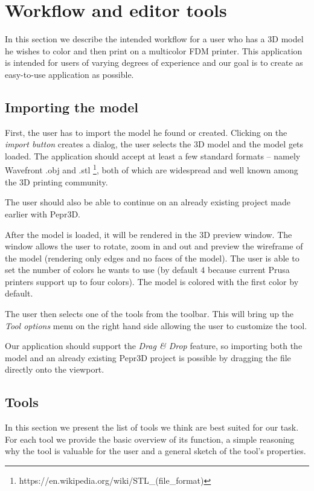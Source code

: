\section{Workflow and editor tools}

In this section we describe the intended workflow for a user who has a 3D model he wishes to color and then print on a multicolor FDM printer. This application is intended for users of varying degrees of experience and our goal is to create as easy-to-use application as possible.

\subsection{Importing the model}

First, the user has to import the model he found or created. Clicking on the \textit{import button} creates a dialog, the user selects the 3D model and the model gets loaded. The application should accept at least a few standard formats -- namely Wavefront $.$obj and $.$stl \footnote{https://en.wikipedia.org/wiki/STL\_(file\_format)}, both of which are widespread and well known among the 3D printing community.

The user should also be able to continue on an already existing project made earlier with Pepr3D.

After the model is loaded, it will be rendered in the 3D preview window. The window allows the user to rotate, zoom in and out and preview the wireframe of the model (rendering only edges and no faces of the model). The user is able to set the number of colors he wants to use (by default $4$ because current Prusa printers support up to four colors). The model is colored with the first color by default.

The user then selects one of the tools from the toolbar. This will bring up the \textit{Tool options} menu on the right hand side allowing the user to customize the tool.

Our application should support the \textit{Drag \& Drop} feature, so importing both the model and an already existing Pepr3D project is possible by dragging the file directly onto the viewport.

\subsection{Tools}

In this section we present the list of tools we think are best suited for our task. For each tool we provide the basic overview of its function, a simple reasoning why the tool is valuable for the user and a general sketch of the tool's properties.

